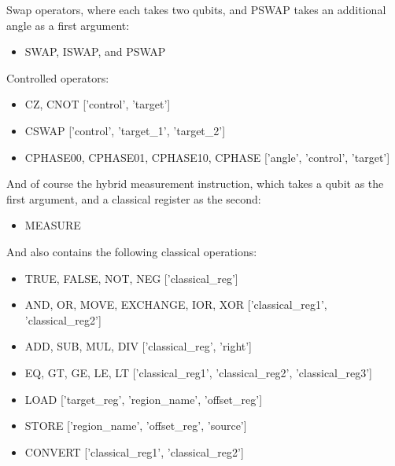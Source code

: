 \documentclass[journal]{article}
\begin{document}
Swap operators, where each takes two qubits, and PSWAP takes an additional angle as a first argument:

\begin{itemize}
    \item SWAP, ISWAP, and PSWAP
\end{itemize}

Controlled operators:

\begin{itemize}
    \item CZ, CNOT ['control', 'target']
    \item CSWAP ['control', 'target\_1', 'target\_2']
    \item CPHASE00, CPHASE01, CPHASE10, CPHASE ['angle', 'control', 'target']
\end{itemize}

And of course the hybrid measurement instruction, which takes a qubit as the first argument, and a classical register as the second:

\begin{itemize}
    \item MEASURE
\end{itemize}

And also contains the following classical operations:

\begin{itemize}
    \item TRUE, FALSE, NOT, NEG ['classical\_reg']
    \item AND, OR, MOVE, EXCHANGE, IOR, XOR ['classical\_reg1', 'classical\_reg2']
    \item ADD, SUB, MUL, DIV ['classical\_reg', 'right']
    \item EQ, GT, GE, LE, LT ['classical\_reg1', 'classical\_reg2', 'classical\_reg3']
    \item LOAD ['target\_reg', 'region\_name', 'offset\_reg']
    \item STORE ['region\_name', 'offset\_reg', 'source']
    \item CONVERT ['classical\_reg1', 'classical\_reg2']
\end{itemize}
\end{document}
